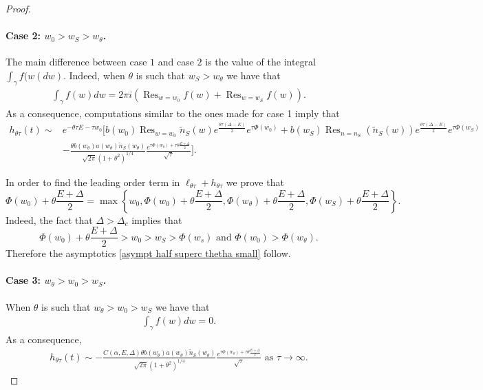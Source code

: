 \documentclass[10pt,a4paper]{amsart}
\begin{document}
\begin{proof}
\paragraph{Case 2: $w_0 > w_S > w_\theta   $. }
The main difference between case $1$ and case $2$ is the value of the integral $\int_\gamma f(w( dw ) $. 
Indeed, when  $\theta $ is such that $w_S > w_\theta $ we have that 
\begin{align*}
 \int_{\gamma} f(w) dw=  2 \pi i \left( \operatorname{Res}_{w=w_0} f(w)+ \operatorname{Res}_{w=w_S} f(w) \right) . 
\end{align*}
As a consequence, computations similar to the ones made for case 1 imply that 
\begin{align*}
        h_{\theta \tau } (t)\sim &e^{ - \theta \tau E - \tau w_0 } [   b(w_0)  \operatorname{Res}_{w=w_0} \tilde{n}_S (w) e^{ \frac{ \theta \tau (\Delta - E) }{2}}  e^{\tau   \Phi(w_0)} +b(w_S) \operatorname{Res}_{n=n_S} \left(\tilde{n}_S (w ) \right) e^{ \frac{ \theta \tau (\Delta - E) }{2}}  e^{\tau   \Phi(w_S)} \\
        &
        - \frac{  \theta  b(w_\theta)   a(w_\theta ) \tilde{n}_S(w_\theta )}{\sqrt{2 \pi } (1+\theta^2)^{1/4}} \frac{ e^{ \tau \Phi(w_\theta ) + \tau\theta  \frac{E+ \Delta}{2}}}{\sqrt{\tau}}].
\end{align*}



In order to find the leading order term in $\ell_{\theta \tau } + h_{\theta \tau }$
 we prove that
\begin{equation}\label{comparison 2.b}
\Phi(w_0) + \theta\frac{E+ \Delta }{2}=\max\left\{ w_0 , \Phi(w_0) + \theta\frac{E+ \Delta }{2}, \Phi(w_\theta) + \theta \frac{E+ \Delta }{2}, \Phi(w_S) + \theta\frac{E+ \Delta }{2}  \right\}.
\end{equation}
Indeed, the fact that $\Delta > \Delta_c$ implies that 
\[
\Phi(w_0) +\theta\frac{E+ \Delta }{2} >w_0 > w_S > \Phi(w_s) \text{ and }  \Phi(w_0)> \Phi(w_\theta).
\]
Therefore the asymptotics \eqref{asympt half superc thetha small} follow. 

\paragraph{Case 3: $w_\theta  > w_0 > w_S   $. }
When  $\theta $ is such that $ w_\theta  > w_0 > w_S  $ we have that 
\begin{align*}
 \int_{\gamma} f(w) dw= 0. 
\end{align*}
As a consequence, 
\begin{align*}
        h_{\theta \tau } (t)\sim 
        - \frac{ C(\alpha, E, \Delta)  \theta  b(w_\theta)   a(w_\theta ) \tilde{n}_S(w_\theta )}{\sqrt{2 \pi } (1+\theta^2)^{1/4}} \frac{ e^{ \tau \Phi(w_\theta ) + \tau\theta  \frac{E+ \Delta}{2}}}{\sqrt{\tau}} \text{ as } \tau \to \infty. 
\end{align*}


\end{proof}
\end{document}
